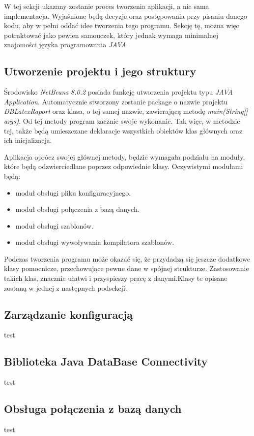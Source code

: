 W tej sekcji ukazany zostanie proces tworzenia aplikacji, a nie sama implementacja. Wyjaśnione będą decyzje oraz postępowania przy pisaniu danego kodu, aby w pełni oddać idee tworzenia tego programu. Sekcję tę, można więc potraktować jako pewien samouczek, który jednak wymaga minimalnej znajomości języka programowania \emph{JAVA}.

\subsection{Utworzenie projektu i jego struktury}

Środowisko \emph{NetBeans 8.0.2} posiada funkcję utworzenia projektu typu \emph{JAVA Application}. Automatycznie stworzony zostanie package o nazwie projektu \emph{DBLatexRaport} oraz klasa, o tej samej nazwie, zawierającą metodę \emph{main(String[] args)}. Od tej metody program zacznie swoje wykonanie. Tak więc, w metodzie tej, także będą umieszczane deklaracje wszystkich obiektów klas głównych oraz ich inicjalizacja. 
\par 
Aplikacja oprócz swojej głównej metody, będzie wymagała podziału na moduły, które będą odzwierciedlane poprzez odpowiednie klasy. Oczywistymi modułami będą:
\begin{itemize}
\item moduł obsługi pliku konfiguracyjnego.
\item moduł obsługi połączenia z bazą danych.
\item moduł obsługi szablonów.
\item moduł obsługi wywoływania kompilatora szablonów.
\end{itemize}
\vspace{5mm}
Podczas tworzenia programu może okazać się, że przydadzą się jeszcze dodatkowe klasy pomocnicze, przechowujące pewne dane w spójnej strukturze. Zastosowanie takich klas, znacznie ułatwi i przyspieszy pracę z danymi.Klasy te opisane zostaną w jednej z następnych podsekcji.

\subsection{Zarządzanie konfiguracją}
test
\subsection{Biblioteka Java DataBase Connectivity}
test
\subsection{Obsługa połączenia z bazą danych}
test
